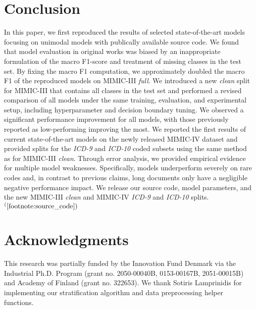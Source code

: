 {\section{Conclusion}
In this paper, we first reproduced the results of selected state-of-the-art models focusing on unimodal models with publically available source code. 
We found that model evaluation in original works was biased by an inappropriate formulation of the macro F1-score and treatment of missing classes in the test set. By fixing the macro F1 computation, we approximately doubled the macro F1 of the reproduced models on MIMIC-III \textit{full}. 
We introduced a new \textit{clean} split for MIMIC-III that contains all classes in the test set and performed a revised comparison of all models under the same training, evaluation, and experimental setup, including hyperparameter and decision boundary tuning. We observed a significant performance improvement for all models, with those previously reported as low-performing improving the most. 
We reported the first results of current state-of-the-art models on the newly released MIMIC-IV dataset \parencite{johnsonMIMICIVFreelyAccessible2023, goldbergerPhysioBankPhysioToolkitPhysioNet2000} and provided splits for the \textit{ICD-9} and \textit{ICD-10} coded subsets using the same method as for MIMIC-III \textit{clean}.
Through error analysis, we provided empirical evidence for multiple model weaknesses. Specifically, models underperform severely on rare codes 
and, in contrast to previous claims, long documents only have a negligible negative performance impact. 
We release our source code, model parameters, and the new MIMIC-III \textit{clean} and MIMIC-IV \textit{ICD-9} and \textit{ICD-10} splits.$^(\ref{footnote:source_code})$

\section*{Acknowledgments}
This research was partially funded by the Innovation Fund Denmark via the Industrial Ph.D. Program (grant no. 2050-00040B, 0153-00167B, 2051-00015B) and Academy of Finland (grant no. 322653).
We thank Sotiris Lamprinidis for implementing our stratification algorithm and data preprocessing helper functions.

}
